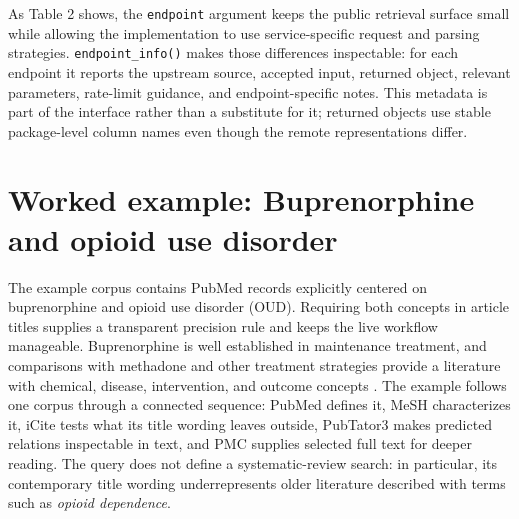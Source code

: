 \begin{table}
\centering
\caption{\label{tab:endpoint-schemas}Remote endpoints exposed by the shared retrieval function.}
\centering
{}
\end{table}

As Table 2 shows, the \texttt{endpoint} argument keeps the public retrieval surface
small while allowing the implementation to use service-specific request and
parsing strategies.
\texttt{endpoint\_info()} makes those differences inspectable: for each endpoint it
reports the upstream source, accepted input, returned object, relevant
parameters, rate-limit guidance, and endpoint-specific notes. This metadata is
part of the interface rather than a substitute for it; returned objects use
stable package-level column names even though the remote representations differ.

\section{Worked example: Buprenorphine and opioid use disorder}\label{worked-example-buprenorphine-and-opioid-use-disorder}

The example corpus contains PubMed records explicitly centered on
buprenorphine and opioid use disorder (OUD). Requiring both concepts in article
titles supplies a transparent precision rule and keeps the live workflow
manageable. Buprenorphine is well established in maintenance treatment, and
comparisons with methadone and other treatment strategies provide a literature
with chemical, disease, intervention, and outcome concepts
\citep{mattick2014buprenorphine}. The example follows one corpus through a connected
sequence: PubMed defines it, MeSH characterizes it, iCite tests what its title
wording leaves outside, PubTator3 makes predicted relations inspectable in text,
and PMC supplies selected full text for deeper reading. The query does not
define a systematic-review search: in particular, its contemporary title
wording underrepresents older literature described with terms such as \emph{opioid
dependence}.

